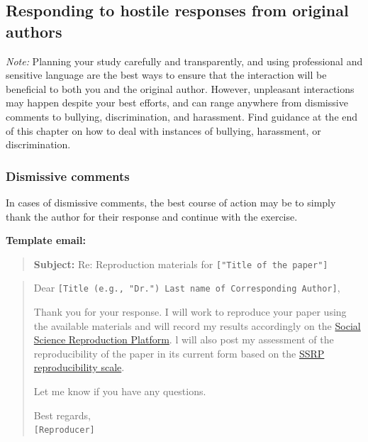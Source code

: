 \documentclass[
]{book}
\begin{document}
\hypertarget{responding-to-hostile-responses-from-original-authors}{%
\subsection{Responding to hostile responses from original authors}\label{responding-to-hostile-responses-from-original-authors}}

\emph{Note:} Planning your study carefully and transparently, and using professional and sensitive language are the best ways to ensure that the interaction will be beneficial to both you and the original author. However, unpleasant interactions may happen despite your best efforts, and can range anywhere from dismissive comments to bullying, discrimination, and harassment. Find guidance at the end of this chapter on how to deal with instances of bullying, harassment, or discrimination.

\hypertarget{dismissive-comments}{%
\subsubsection{Dismissive comments}\label{dismissive-comments}}

In cases of dismissive comments, the best course of action may be to simply thank the author for their response and continue with the exercise.

\textbf{Template email:}

\begin{quote}
\textbf{Subject:} Re: Reproduction materials for \texttt{{[}"Title\ of\ the\ paper"{]}}
\end{quote}

\begin{quote}
Dear \texttt{{[}Title\ (e.g.,\ "Dr.")\ Last\ name\ of\ Corresponding\ Author{]}},

Thank you for your response. I will work to reproduce your paper using the available materials and will record my results accordingly on the \href{https://www.socialsciencereproduction.org/}{Social Science Reproduction Platform}. l will also post my assessment of the reproducibility of the paper in its current form based on the \href{https://bitss.github.io/ACRE/assessment.html\#levels-of-computational-reproducibility-for-a-specific-output}{SSRP reproducibility scale}.

Let me know if you have any questions.

Best regards,\\
\texttt{{[}Reproducer{]}}
\end{quote}
\end{document}
